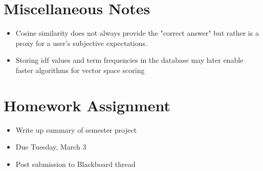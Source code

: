 \documentclass{article}
\begin{document}
\section{Miscellaneous Notes}
\begin{itemize}
    \item Cosine similarity does not always provide the "correct answer" but rather is a proxy for a user's subjective expectations.
    \item Storing idf values and term frequencies in the database may later enable faster algorithms for vector space scoring
\end{itemize}{}



\section{Homework Assignment}
\begin{itemize}
	\item Write up summary of semester project
	\item Due Tuesday, March 3
	\item Post submission to Blackboard thread
\end{itemize}{}
\end{document}
